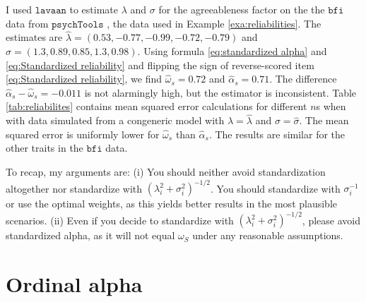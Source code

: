 \documentclass[twoside]{article}
\begin{document}
\begin{example}
%
I used $\mathtt{lavaan}$ to estimate $\lambda$ and $\sigma$ for the agreeableness factor on the the $\texttt{bfi}$ data from $\texttt{psychTools}$ \citep{Revelle2019-te}, the data used in Example \ref{exa:reliabilities}. The estimates are $\hat{\lambda} = (0.53, -0.77, -0.99, -0.72, -0.79)$ and $\hat{\sigma} = (1.3, 0.89, 0.85, 1.3, 0.98)$. Using formula \eqref{eq:standardized alpha} and \eqref{eq:Standardized reliability} and flipping the sign of reverse-scored item \eqref{eq:Standardized reliability}, we find $\hat{\omega}_s = 0.72$ and $\hat{\alpha}_s = 0.71$. The difference $\hat{\alpha}_s - \hat{\omega}_s = -0.011$ is not alarmingly high, but the estimator is inconsistent. Table \ref{tab:reliabilites} contains mean squared error calculations for different $n$s when with data simulated from a congeneric model with $\lambda=\hat{\lambda}$ and $\sigma = \hat{\sigma}$. The mean squared error is uniformly lower for $\hat{\omega}_s$ than $\hat{\alpha}_s$. The results are similar for the other traits in the $\texttt{bfi}$ data.
\end{example}

To recap, my arguments are: (i) You should neither avoid standardization altogether nor standardize with $(\lambda_{i}^{2}+\sigma_{i}^{2})^{-1/2}$. You should standardize with $\sigma_i^{-1}$ or use the optimal weights, as this yields better results in the most plausible scenarios. (ii) Even if you decide to standardize with $(\lambda_{i}^{2}+\sigma_{i}^{2})^{-1/2}$, please avoid standardized alpha, as it will not equal $\omega_S$ under any reasonable assumptions.

\section{Ordinal alpha\label{sec:Ordinal alpha}}
\end{document}
